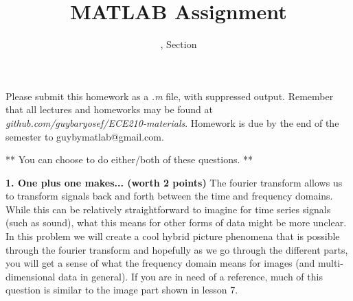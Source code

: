 \documentclass[11pt]{article}
\title{MATLAB Assignment \Homework}
\author{\Session, Section \Section}
\date{}
\makeatletter
\def\MyEmail{guybymatlab@gmail.com}
\makeatother
\begin{document}
\maketitle
Please submit this homework as a \textit{.m} file, 
with suppressed output.
Remember that all lectures and homeworks may be found at 
\textit{github.com/guybaryosef/ECE210-materials}.
Homework is due by the end of the semester to \MyEmail.

** You can choose to do either/both of these questions. **

\noindent
\newline
\textbf{1. One plus one makes... (worth 2 points)}
The fourier transform allows us to transform signals back and 
forth between the time and frequency domains.
While this can be relatively straightforward to imagine for time series signals
(such as sound), what this means for other forms
of data might be more unclear.
In this problem we will create a cool hybrid picture phenomena that
is possible through the fourier transform and hopefully as we go 
through the different parts, you will get a sense of what the frequency
domain means for images (and multi-dimensional data in general).
If you are in need of a reference,
much of this question is similar to the image part shown in lesson 7.
\end{document}
